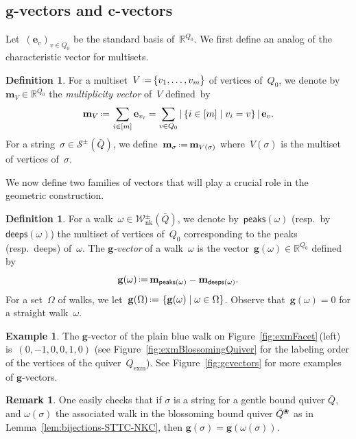 \documentclass{amsart}
\theoremstyle{definition}
\newtheorem{definition}[theorem]{Definition}
\newtheorem{example}[theorem]{Example}
\newtheorem{remark}[theorem]{Remark}
\newcommand{\R}{\mathbb{R}} %
\renewcommand{\b}[1]{\mathbf{#1}} %
\newcommand{\set}[2]{\left\{ #1 \;\middle|\; #2 \right\}} %
\newcommand{\eqdef}{\mbox{\,\raisebox{0.2ex}{\scriptsize\ensuremath{\mathrm:}}\ensuremath{=}\,}} %
\newcommand{\fref}[1]{Figure~\ref{#1}} %
\newcommand{\darkblue}{\color{darkblue}} %
\newcommand{\defn}[1]{\textsl{\darkblue #1}} %
\newcommand{\ex}{_{\textrm{exm}}} %
\newcommand{\blossom}{^\text{\ding{96}}} %
\newcommand{\strings}{\mathcal{S}} %
\newcommand{\NKWalks}{\mathcal{W}_\mathrm{nk}} %
\newcommand{\peaks}[1]{\mathsf{peaks}(#1)} %
\newcommand{\deeps}[1]{\mathsf{deeps}(#1)} %
\newcommand{\gvector}[1]{\mathbf{g}(#1)} %
\newcommand{\gvectors}[1]{\mathbf{g}(#1)} %
\newcommand{\multiplicityVector}{\b{m}} %
\begin{document}
\subsection{$\b{g}$-vectors and $\b{c}$-vectors}
\label{subsec:gcvectors}

Let~$(\b{e}_v)_{v \in Q_0}$ be the standard basis of~$\R^{Q_0}$.
We first define an analog of the characteristic vector for multisets.

\begin{definition}
For a multiset~$V \eqdef \{v_1, \dots, v_m\}$ of vertices of~$Q_0$, we denote by~$\multiplicityVector_V \in \R^{Q_0}$ the \defn{multiplicity vector} of~$V$ defined~by
\[
\multiplicityVector_V \eqdef \sum_{i \in [m]} \b{e}_{v_i} = \sum_{v \in Q_0} |\set{i \in [m]}{v_i = v}| \, \b{e}_v.
\]
For a string~$\sigma \in \strings^\pm(\bar Q)$, we define~$\multiplicityVector_\sigma \eqdef \multiplicityVector_{V(\sigma)}$ where~$V(\sigma)$ is the multiset of vertices of~$\sigma$. 
\end{definition}

We now define two families of vectors that will play a crucial role in the geometric construction.

\begin{definition}\label{def: g-vectors for walks}
For a walk~$\omega \in \NKWalks^\pm(\bar Q)$, we denote by~$\peaks{\omega}$ (resp.~by~$\deeps{\omega}$) the multiset of vertices of~$Q_0$ corresponding to the peaks (resp.~deeps) of~$\omega$.
The \defn{$\b{g}$-vector} of a walk~$\omega$ is the vector~${\gvector{\omega} \in \R^{Q_0}}$ defined by
\[
\gvector{\omega} \eqdef \multiplicityVector_{\peaks{\omega}} - \multiplicityVector_{\deeps{\omega}}.
\]
For a set~$\Omega$ of walks, we let~$\gvectors{\Omega} \eqdef \set{\gvector{\omega}}{\omega \in \Omega}$.
Observe that~$\gvector{\omega} = 0$ for a straight walk~$\omega$.
\end{definition}

\begin{example}
The $\b{g}$-vector of the plain blue walk on \fref{fig:exmFacet}\,(left) is~$(0,-1,0,0,1,0)$ (see \fref{fig:exmBlossomingQuiver} for the labeling order of the vertices of the quiver~$Q\ex$).
See \fref{fig:gcvectors} for more examples of $\b{g}$-vectors.
\end{example}

\begin{remark}\label{rem: g-vectors coincide}
One easily checks that if $\sigma$ is a string for a gentle bound quiver $\bar Q$, and $\omega(\sigma)$ the associated walk in the blossoming bound quiver $\bar Q\blossom$ as in Lemma~\ref{lem:bijections-STTC-NKC}, then $\gvector{\sigma}=\gvector{\omega(\sigma)}$.
\end{remark}
\end{document}
